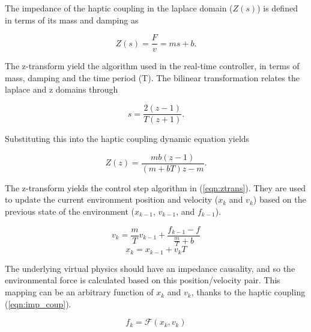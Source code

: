 \documentclass[12pt]{report}
\begin{document}
		
		
	
	
	The impedance of the haptic coupling in the laplace domain ($Z(s)$) is defined in terms of its mass and damping as
	
	\begin{equation} \label{eqn:haptic}
		Z(s) = \frac{F}{v} = ms + b .
	\end{equation}
	
The z-transform \cite{ztrans} yield the algorithm used in the real-time controller, in terms of mass, damping and the time period (T). The bilinear transformation relates the laplace and z domains through

	\begin{equation}
		s = \frac{2(z-1)}{T(z+1)}.
	\end{equation}
	
	Substituting this into the haptic coupling dynamic equation yields

	\begin{equation}
		Z(z) = \frac{mb(z-1)}{(m+bT)z - m}.
	\end{equation}
	
	The z-transform yields the control step algorithm in (\ref{eqn:ztrans}). They are used to update the current environment position and velocity ($x_k$ and $v_k$) based on the previous state of the environment ($x_{k-1}$, $v_{k-1}$, and $f_{k-1}$).

\begin{equation} \label{eqn:ztrans}
	v_k = \frac{m}{T}v_{k-1} + \frac{f_{k-1} - f}{\frac{m}{T} + b}
\end{equation}
\begin{equation}
	x_k = x_{k-1} + v_{k}T
\end{equation}

	
The underlying virtual physics should have an impedance causality, and so the environmental force is calculated based on this position/velocity pair. This mapping can be an arbitrary function of $x_k$ and $v_k$, thanks to the haptic coupling (\ref{eqn:imp_coup}). 
 
\begin{equation} \label{eqn:imp_coup}
	f_k = \mathcal{F}(x_k, v_k)
\end{equation}
\end{document}
